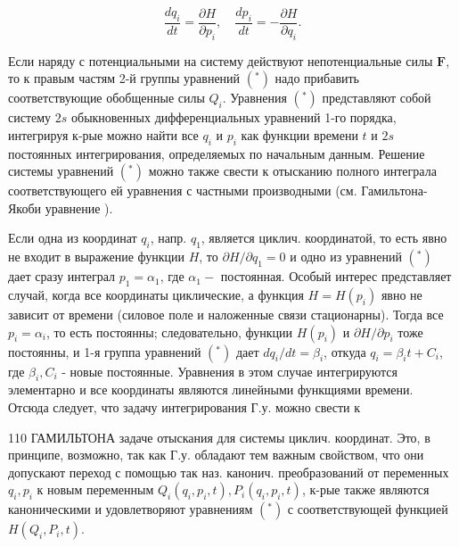 \documentclass[10pt]{article}
\begin{document}
\[

\frac{d q_{i}}{d t}=\frac{\partial H}{\partial p_{i}}, \quad \frac{d p_{i}}{d t}=-\frac{\partial H}{\partial q_{i}} .

\]



Если наряду с потенциальными на систему действуют непотенциальные силы $\boldsymbol{F}$, то к правым частям 2-й группы уравнений $\left({ }^{*}\right)$ надо прибавить соответствующие обобщенные силы $Q_{i}$. Уравнения $\left({ }^{*}\right)$ представляют собой систему $2 s$ обыкновенных дифференциальных уравнений 1-го порядка, интегрируя к-рые можно найти все $q_{i}$ и $p_{i}$ как функции времени $t$ и $2 s$ постоянных интегрирования, определяемых по начальным данным. Решение системы уравнений $\left({ }^{*}\right)$ можно также свести к отысканию полного интеграла соответствующего ей уравнения с частными производными (см. Гамильтона-Якоби уравнение ).



Если одна из координат $q_{i}$, напр. $q_{1}$, является циклич. координатой, то есть явно не входит в выражение функции $H$, то $\partial H / \partial q_{1}=0$ и одно из уравнений $\left({ }^{*}\right)$ дает сразу интеграл $p_{1}=\alpha_{1}$, где $\alpha_{1}-$ постоянная. Особый интерес представляет случай, когда все координаты циклические, а функция $H=H\left(p_{i}\right)$ явно не зависит от времени (силовое поле и наложенные связи стационарны). Тогда все $p_{i}=\alpha_{i}$, то есть постоянны; следовательно, функции $H\left(p_{i}\right)$ и $\partial H / \partial p_{i}$ тоже постоянны, и 1-я группа уравнений $\left(^{*}\right)$ дает $d q_{i} / d t=\beta_{i}$, откуда $q_{i}=\beta_{i} t+C_{i}$, где $\beta_{i}, C_{i}$ - новые постоянные. Уравнения в этом случае интегрируются элементарно и все координаты являются линейными функщиями времени. Отсюда следует, что задачу интегрирования Г.у. можно свести к



110 ГАМИЛЬТОНА задаче отыскания для системы циклич. координат. Это, в принципе, возможно, так как Г.у. обладают тем важным свойством, что они допускают переход с помощью так наз. канонич. преобразований от переменных $q_{i}, p_{i}$ к новым переменным $Q_{i}\left(q_{i}, p_{i}, t\right), P_{i}\left(q_{i}, p_{i}, t\right)$, к-рые также являются каноническими и удовлетворяют уравнениям $\left({ }^{*}\right)$ с соответствующей функцией $H\left(Q_{i}, P_{i}, t\right)$.
\end{document}
